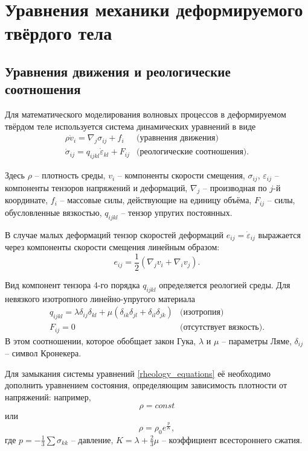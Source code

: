\section{Уравнения механики деформируемого твёрдого тела}
\subsection{Уравнения движения и реологические соотношения}
Для математического моделирования волновых процессов в деформируемом твёрдом
теле используется система динамических уравнений \cite{novatsky,sedov} в виде
\begin{eqnarray}
\label{rheology_equations}
\rho\dot{v}_i=\nabla_j\sigma_{ij}+f_i & \textrm{(уравнения движения)}\nonumber\\
\dot{\sigma}_{ij}=q_{ijkl}\dot{\varepsilon}_{kl}+F_{ij} & \textrm{(реологические
соотношения).}
\end{eqnarray}

Здесь $\rho$ – плотность среды, $v_i$ – компоненты скорости смещения,
$\sigma_{ij}$, $\varepsilon_{ij}$ -- компоненты тензоров напряжений и деформаций,
$\nabla_j$ – производная по $j$-й координате, $f_i$ – массовые
силы, действующие на единицу объёма, $F_{ij}$ -- силы, обусловленные вязкостью, $q_{ijkl}$ -- 
тензор упругих постоянных.

В случае малых деформаций тензор скоростей деформаций $e_{ij}=\dot{\varepsilon}_{ij}$ 
выражается через компоненты скорости смещения линейным образом:
\begin{equation}
e_{ij}=\frac{1}{2}(\nabla_j v_i+\nabla_i v_j).
\end{equation}

Вид компонент тензора 4-го порядка $q_{ijkl}$ определяется реологией среды. Для 
невязкого изотропного линейно-упругого материала
\begin{eqnarray}
\label{tensor_qijkl}
q_{ijkl}=\lambda\delta_{ij}\delta_{kl}+\mu(\delta_{ik}\delta_{jl}+\delta_{il}
\delta_{jk}) & \textrm {(изотропия)} \nonumber\\
F_{ij}=0 & \textrm {(отсутствует вязкость).}
\end{eqnarray}
В этом соотношении, которое обобщает закон Гука, $\lambda$ и $\mu$ -- параметры
Ляме, $\delta_{ij}$ -- символ Кронекера.

Для замыкания системы уравнений \ref{rheology_equations} её необходимо дополнить
уравнением состояния, определяющим зависимость плотности от напряжений:
например, $$\rho=const$$ или
$$\rho=\rho_0e^{\frac{p}{K}},$$
где $p=-\frac{1}{3}\sum\sigma_{kk}$ -- давление, $K=\lambda+\frac{2}{3}\mu$ --
коэффициент всестороннего сжатия.


